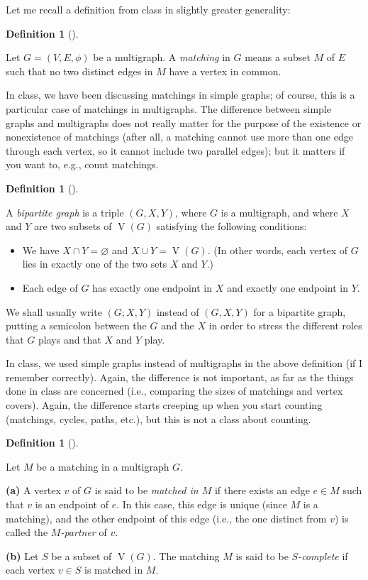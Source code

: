 \documentclass[numbers=enddot,12pt,final,onecolumn,notitlepage]{scrartcl}%
\theoremstyle{definition}
\newtheorem{defi}[theo]{Definition}
\newenvironment{definition}[1][]
{\begin{defi}[#1]\begin{leftbar}}
{\end{leftbar}\end{defi}}
\newcommand{\tup}[1]{\left( #1 \right)}
\newcommand{\verts}[1]{\operatorname{V}\left( #1 \right)}
\begin{document}
Let me recall a definition from class in slightly greater generality:

\begin{definition}
Let $G = \tup{V, E, \phi}$ be a multigraph.
A \textit{matching} in $G$ means a subset $M$ of $E$ such that no two
distinct edges in $M$ have a vertex in common.
\end{definition}

In class, we have been discussing matchings in simple graphs; of
course, this is a particular case of matchings in multigraphs.
The difference between simple graphs and multigraphs does not really
matter for the purpose of the existence or nonexistence of matchings
(after all, a matching cannot use more than one edge through each
vertex, so it cannot include two parallel edges);
but it matters if you want to, e.g., count matchings.

\begin{definition}
A \textit{bipartite graph} is a triple $\tup{G, X, Y}$,
where $G$ is a multigraph, and
where $X$ and $Y$ are two subsets of $\verts{G}$
satisfying the following conditions:

\begin{itemize}
\item We have $X \cap Y = \varnothing$ and
      $X \cup Y = \verts{G}$.
      (In other words, each vertex of $G$ lies in exactly one of the
      two sets $X$ and $Y$.)
\item Each edge of $G$ has exactly one endpoint in $X$ and exactly one
      endpoint in $Y$.
\end{itemize}

We shall usually write $\tup{G; X, Y}$ instead of $\tup{G, X, Y}$ for
a bipartite graph, putting a semicolon between the $G$ and the $X$ in
order to stress the different roles that $G$ plays and that $X$ and
$Y$ play.
\end{definition}

In class, we used simple graphs instead of multigraphs in the above
definition (if I remember correctly).
Again, the difference is not important, as far as the things done in
class are concerned (i.e., comparing the sizes of
matchings and vertex covers).
Again, the difference starts creeping up when you start counting
(matchings, cycles, paths, etc.), but this is not a class about
counting.

\begin{definition}
Let $M$ be a matching in a multigraph $G$.

\textbf{(a)} A vertex $v$ of $G$ is said to be \textit{matched in $M$}
if there exists an edge $e \in M$ such that $v$ is an endpoint of $e$.
In this case, this edge is unique (since $M$ is a matching), and the
other endpoint of this edge (i.e., the one distinct from $v$) is
called the \textit{$M$-partner} of $v$.

\textbf{(b)} Let $S$ be a subset of $\verts{G}$.
The matching $M$ is said to be \textit{$S$-complete} if each vertex
$v \in S$ is matched in $M$.
\end{definition}
\end{document}
